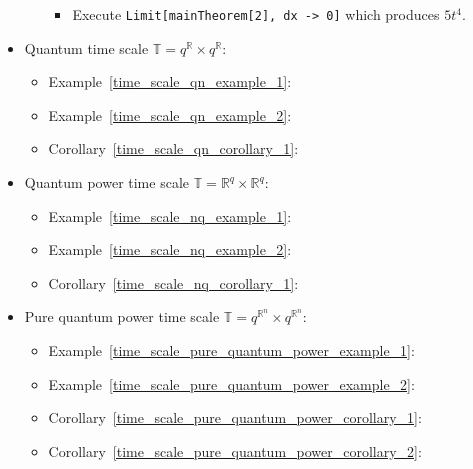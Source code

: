 \begin{itemize}
\begin{itemize}
\begin{itemize}
            \item Execute \texttt{Limit[mainTheorem[2], dx -> 0]} which produces $5t^4$.
        \end{itemize}
    \end{itemize}
    \item Quantum time scale $\mathbb{T} = q^\mathbb{R} \times q^\mathbb{R}$:
    \begin{itemize}
        \item Example~\ref{time_scale_qn_example_1}:
        \item Example~\ref{time_scale_qn_example_2}:
        \item Corollary~\ref{time_scale_qn_corollary_1}:
    \end{itemize}
    \item Quantum power time scale $\mathbb{T} = \mathbb{R}^q \times \mathbb{R}^q$:
    \begin{itemize}
        \item Example~\ref{time_scale_nq_example_1}:
        \item Example~\ref{time_scale_nq_example_2}:
        \item Corollary~\ref{time_scale_nq_corollary_1}:
    \end{itemize}
    \item Pure quantum power time scale $\mathbb{T} = q^{\mathbb{R}^n} \times q^{\mathbb{R}^n}$:
    \begin{itemize}
        \item Example~\ref{time_scale_pure_quantum_power_example_1}:
        \item Example~\ref{time_scale_pure_quantum_power_example_2}:
        \item Corollary~\ref{time_scale_pure_quantum_power_corollary_1}:
        \item Corollary~\ref{time_scale_pure_quantum_power_corollary_2}:
    \end{itemize}
\end{itemize}
